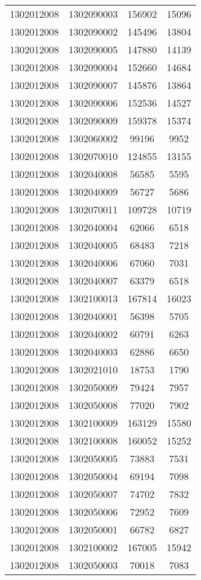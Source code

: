 \begin{longtable}[h]{llcc}
		1302012008 & 1302090003 & 156902 & 15096\\
		1302012008 & 1302090002 & 145496 & 13804\\
		1302012008 & 1302090005 & 147880 & 14139\\
		1302012008 & 1302090004 & 152660 & 14684\\
		1302012008 & 1302090007 & 145876 & 13864\\
		1302012008 & 1302090006 & 152536 & 14527\\
		1302012008 & 1302090009 & 159378 & 15374\\
		1302012008 & 1302060002 & 99196 & 9952\\
		1302012008 & 1302070010 & 124855 & 13155\\
		1302012008 & 1302040008 & 56585 & 5595\\
		1302012008 & 1302040009 & 56727 & 5686\\
		1302012008 & 1302070011 & 109728 & 10719\\
		1302012008 & 1302040004 & 62066 & 6518\\
		1302012008 & 1302040005 & 68483 & 7218\\
		1302012008 & 1302040006 & 67060 & 7031\\
		1302012008 & 1302040007 & 63379 & 6518\\
		1302012008 & 1302100013 & 167814 & 16023\\
		1302012008 & 1302040001 & 56398 & 5705\\
		1302012008 & 1302040002 & 60791 & 6263\\
		1302012008 & 1302040003 & 62886 & 6650\\
		1302012008 & 1302021010 & 18753 & 1790\\
		1302012008 & 1302050009 & 79424 & 7957\\
		1302012008 & 1302050008 & 77020 & 7902\\
		1302012008 & 1302100009 & 163129 & 15580\\
		1302012008 & 1302100008 & 160052 & 15252\\
		1302012008 & 1302050005 & 73883 & 7531\\
		1302012008 & 1302050004 & 69194 & 7098\\
		1302012008 & 1302050007 & 74702 & 7832\\
		1302012008 & 1302050006 & 72952 & 7609\\
		1302012008 & 1302050001 & 66782 & 6827\\
		1302012008 & 1302100002 & 167005 & 15942\\
		1302012008 & 1302050003 & 70018 & 7083\\

\end{longtable}
